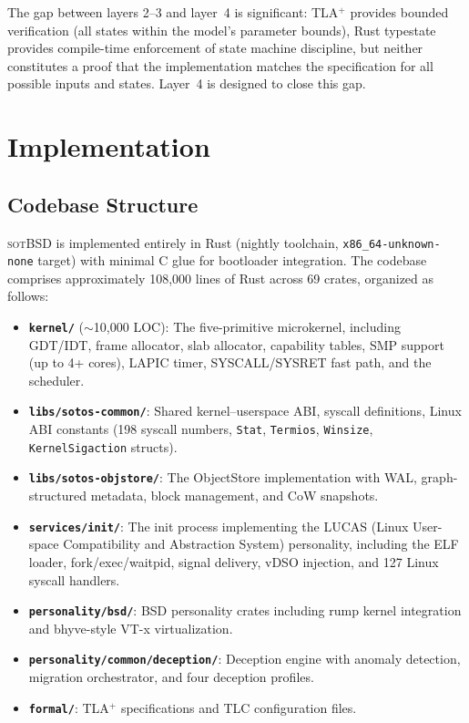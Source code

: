 \documentclass[11pt,a4paper]{article}
\theoremstyle{definition}
\theoremstyle{remark}
\newcommand{\sotbsd}{\textsc{sotBSD}}
\begin{document}
The gap between layers 2--3 and layer~4 is significant: TLA$^+$
provides bounded verification (all states within the model's
parameter bounds), Rust typestate provides compile-time enforcement
of state machine discipline, but neither constitutes a proof that
the implementation matches the specification for all possible inputs
and states. Layer~4 is designed to close this gap.

\section{Implementation}
\label{sec:impl}

\subsection{Codebase Structure}
\label{sec:impl-codebase}

\sotbsd{} is implemented entirely in Rust (nightly toolchain,
\texttt{x86\_64-unknown-none} target) with minimal C glue for
bootloader integration. The codebase comprises approximately 108{,}000
lines of Rust across 69 crates, organized as follows:

\begin{itemize}[leftmargin=1.4em]
\item \textbf{\texttt{kernel/}} ($\sim$10{,}000 LOC): The five-primitive
  microkernel, including GDT/IDT, frame allocator, slab allocator,
  capability tables, SMP support (up to 4+ cores), LAPIC timer,
  SYSCALL/SYSRET fast path, and the scheduler.

\item \textbf{\texttt{libs/sotos-common/}}: Shared kernel--userspace
  ABI, syscall definitions, Linux ABI constants (198 syscall numbers,
  \texttt{Stat}, \texttt{Termios}, \texttt{Winsize},
  \texttt{KernelSigaction} structs).

\item \textbf{\texttt{libs/sotos-objstore/}}: The ObjectStore
  implementation with WAL, graph-structured metadata, block management,
  and CoW snapshots.

\item \textbf{\texttt{services/init/}}: The init process implementing
  the LUCAS (Linux User-space Compatibility and Abstraction System)
  personality, including the ELF loader, fork/exec/waitpid, signal
  delivery, vDSO injection, and 127 Linux syscall handlers.

\item \textbf{\texttt{personality/bsd/}}: BSD personality crates
  including rump kernel integration and bhyve-style VT-x
  virtualization.

\item \textbf{\texttt{personality/common/deception/}}: Deception engine
  with anomaly detection, migration orchestrator, and four deception
  profiles.

\item \textbf{\texttt{formal/}}: TLA$^+$ specifications and TLC
  configuration files.
\end{itemize}
\end{document}
